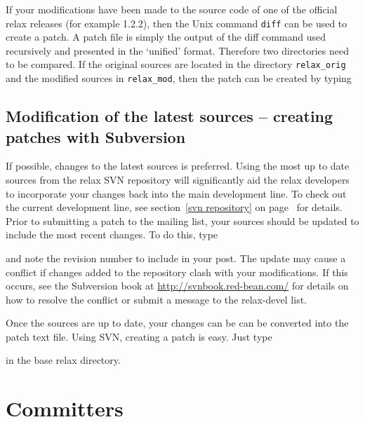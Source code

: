 If your modifications have been made to the source code of one of the official relax releases (for example 1.2.2), then the Unix command \texttt{diff} can be used to create a patch.  A patch file is simply the output of the diff command used recursively and presented in the `unified' format.  Therefore two directories need to be compared.  If the original sources are located in the directory \texttt{relax\_orig} and the modified sources in \texttt{relax\_mod}, then the patch can be created by typing



\subsection{Modification of the latest sources -- creating patches with Subversion}

If possible, changes to the latest sources is preferred.  Using the most up to date sources from the relax SVN repository will significantly aid the relax developers to incorporate your changes back into the main development line.  To check out the current development line, see section~\ref{svn repository} on page~\pageref{svn repository} for details.  Prior to submitting a patch to the mailing list, your sources should be updated to include the most recent changes.  To do this, type


and note the revision number to include in your post.  The update may cause a conflict if changes added to the repository clash with your modifications.  If this occurs, see the Subversion book at \href{http://svnbook.red-bean.com/}{http://svnbook.red-bean.com/} for details on how to resolve the conflict or submit a message to the relax-devel list.

Once the sources are up to date, your changes can be can be converted into the patch text file.  Using SVN, creating a patch is easy.  Just type


in the base relax directory.




\section{Committers}


